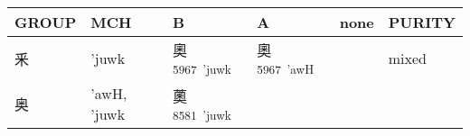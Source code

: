 \documentclass[14pt,a4paper]{scrartcl}
\begin{document}
\begin{longtable}[c]{@{}llllll@{}}
\toprule
\begin{minipage}[b]{0.14\columnwidth}\raggedright\strut
GROUP
\strut\end{minipage} &
\begin{minipage}[b]{0.14\columnwidth}\raggedright\strut
MCH
\strut\end{minipage} &
\begin{minipage}[b]{0.14\columnwidth}\raggedright\strut
B
\strut\end{minipage} &
\begin{minipage}[b]{0.14\columnwidth}\raggedright\strut
A
\strut\end{minipage} &
\begin{minipage}[b]{0.14\columnwidth}\raggedright\strut
none
\strut\end{minipage} &
\begin{minipage}[b]{0.14\columnwidth}\raggedright\strut
PURITY
\strut\end{minipage}\tabularnewline
\midrule
\endhead
\begin{minipage}[t]{0.14\columnwidth}\raggedright\strut
釆
\strut\end{minipage} &
\begin{minipage}[t]{0.14\columnwidth}\raggedright\strut
'juwk
\strut\end{minipage} &
\begin{minipage}[t]{0.14\columnwidth}\raggedright\strut
奧\textsuperscript{5967~'juwk}
\strut\end{minipage} &
\begin{minipage}[t]{0.14\columnwidth}\raggedright\strut
奧\textsuperscript{5967~'awH}
\strut\end{minipage} &
\begin{minipage}[t]{0.14\columnwidth}\raggedright\strut
\strut\end{minipage} &
\begin{minipage}[t]{0.14\columnwidth}\raggedright\strut
mixed
\strut\end{minipage}\tabularnewline
\begin{minipage}[t]{0.14\columnwidth}\raggedright\strut
奥
\strut\end{minipage} &
\begin{minipage}[t]{0.14\columnwidth}\raggedright\strut
'awH, 'juwk
\strut\end{minipage} &
\begin{minipage}[t]{0.14\columnwidth}\raggedright\strut
薁\textsuperscript{8581~'juwk}
\strut\end{minipage} &

\end{longtable}
\end{document}
